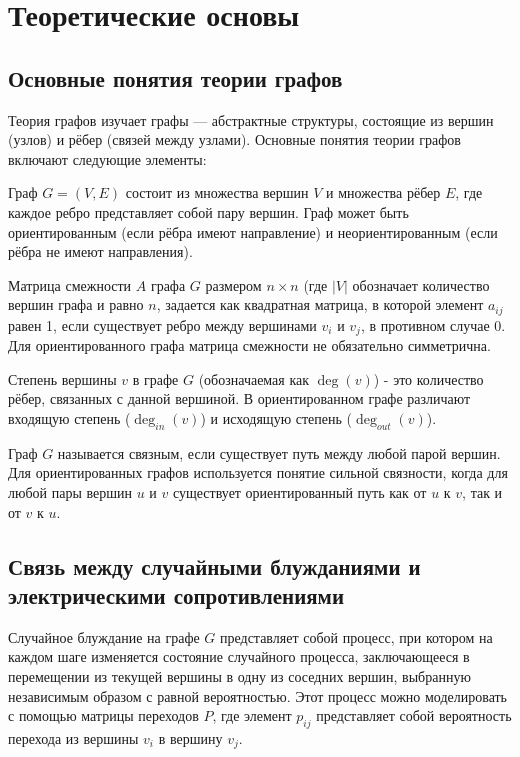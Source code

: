 \chapter{Теоретические основы}
\label{cha:theory}

\section{Основные понятия теории графов}

Теория графов изучает графы — абстрактные структуры, состоящие из вершин (узлов) и рёбер (связей между узлами). Основные понятия теории графов включают следующие элементы:

Граф \(G = (V, E)\) состоит из множества вершин \(V\) и множества рёбер \(E\), где каждое ребро представляет собой пару вершин. Граф может быть ориентированным (если рёбра имеют направление) и неориентированным (если рёбра не имеют направления).

Матрица смежности \(A\) графа \(G\) размером \(n \times n\) (где \(|V|\) обозначает количество вершин графа и равно \(n\), задается как квадратная матрица, в которой элемент \(a_{ij}\) равен 1, если существует ребро между вершинами \(v_i\) и \(v_j\), в противном случае 0. Для ориентированного графа матрица смежности не обязательно симметрична\cite{7}.

Степень вершины \(v\) в графе \(G\) (обозначаемая как \(\deg(v)\)) - это количество рёбер, связанных с данной вершиной. В ориентированном графе различают входящую степень (\(\deg_{in}(v)\)) и исходящую степень (\(\deg_{out}(v)\))\cite{6}.

Граф \(G\) называется связным, если существует путь между любой парой вершин. Для ориентированных графов используется понятие сильной связности, когда для любой пары вершин \(u\) и \(v\) существует ориентированный путь как от \(u\) к \(v\), так и от \(v\) к \(u\)\cite{8}.

\section{Связь между случайными блужданиями и электрическими сопротивлениями}

Случайное блуждание на графе \(G\) представляет собой процесс, при котором на каждом шаге изменяется состояние случайного процесса, заключающееся в перемещении из текущей вершины в одну из соседних вершин, выбранную независимым образом с равной вероятностью. Этот процесс можно моделировать с помощью матрицы переходов \(P\), где элемент \(p_{ij}\) представляет собой вероятность перехода из вершины \(v_i\) в вершину \(v_j\).

